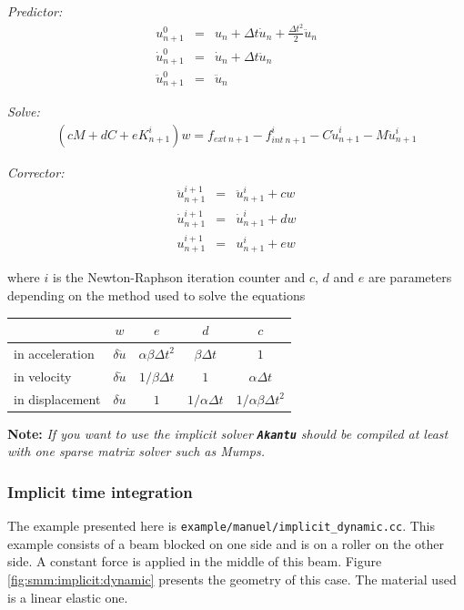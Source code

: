 \documentclass[a4paper,11pt]{book}
\newcommand{\akantu}{\texttt{\textbf{Akantu}}\xspace}
\newcommand{\code}[1]{\texttt{#1}}
\newcommand{\note}[1]{\textbf{Note: }\textit{#1}}
\begin{document}
\noindent\textit{Predictor:}
\begin{eqnarray}
  u^{0}_{n+1} &=& u_{n}  + \Delta t \dot{u}_n +  \frac{\Delta t^2}{2} \ddot{u}_n
  \\
  \dot{u}^{0}_{n+1}  &=& \dot{u}_{n} +  \Delta t \ddot{u}_{n} \\
  \ddot{u}^{0}_{n+1} &=& \ddot{u}_{n}
\end{eqnarray}

\noindent\textit{Solve:}
\begin{eqnarray}
 (c M + d C + e K^i_{n+1}) w = f_{ext~n+1} - f^i_{int~n+1} - C \dot{u}^i_{n+1} -
 M \ddot{u}^i_{n+1}
\end{eqnarray}

\noindent\textit{Corrector:}
\begin{eqnarray}
  \ddot{u}^{i+1}_{n+1} &=& \ddot{u}^{i}_{n+1} + c w \\
  \dot{u}^{i+1}_{n+1} &=& \dot{u}^{i}_{n+1} + d w \\
  u^{i+1}_{n+1} &=& u^{i}_{n+1} + e w
\end{eqnarray}

where  $i$ is  the Newton-Raphson  iteration counter  and $c$,  $d$ and  $e$ are
parameters depending on the method used to solve the equations

\begin{center}
  \begin{tabular}{l|c|c|c|c}
    & $w$ & $e$ & $d$ & $c$\\
    \hline
    in  acceleration &$  \delta \ddot{u}$  & $\alpha  \beta \Delta  t^2$ &$\beta
    \Delta t$ &$1$\\
    in velocity &  $ \delta \dot{u}$& $1/\beta \Delta t$ &  $1$ & $\alpha \Delta
    t$\\
    in displacement &$\delta  u$ & $ 1$ & $1/\alpha \Delta  t$ & $1/\alpha \beta
    \Delta t^2$
  \end{tabular}
\end{center}

\note{If you want to use the implicit solver \akantu should be compiled at
  least with one sparse matrix solver such as Mumps\cite{mumps}.}


\subsubsection{Implicit time integration}
The example  presented here is  \code{example/manuel/implicit\_dynamic.cc}. This
example consists of a  beam blocked on one side and is on  a roller on the other
side.   A  constant  force is  applied  in  the  middle  of this  beam.   Figure
\ref{fig:smm:implicit:dynamic} presents the geometry  of this case. The material
used is a linear elastic one.
\end{document}
